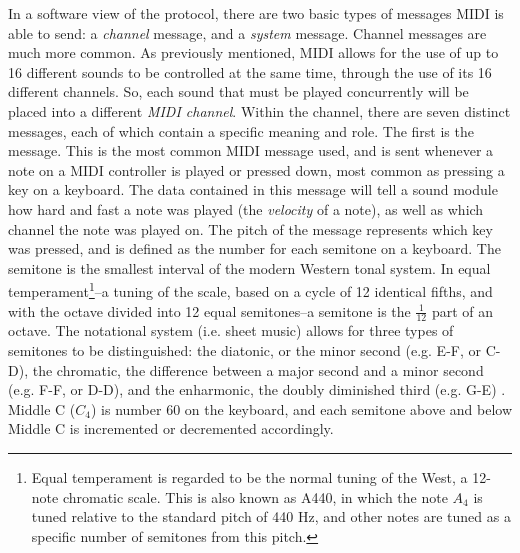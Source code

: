 In a software view of the protocol, there are two basic types of messages MIDI is able to send: a \textit{channel} message, and a \textit{system} message. Channel messages are much more common. As previously mentioned, MIDI allows for the use of up to 16 different sounds to be controlled at the same time, through the use of its 16 different channels. So, each sound that must be played concurrently will be placed into a different \textit{MIDI channel}. Within the channel, there are seven distinct messages, each of which contain a specific meaning and role. The first is the  message. This is the most common MIDI message used, and is sent whenever a note on a MIDI controller is played or pressed down, most common as pressing a key on a keyboard. The data contained in this message will tell a sound module how hard and fast a note was played (the \textit{velocity} of a note), as well as which channel the note was played on\cite{Romano_2003}. The pitch of the message represents which key was pressed, and is defined as the number for each semitone on a keyboard. The semitone is the smallest interval of the modern Western tonal system. In equal temperament\footnote{Equal temperament is regarded to be the normal tuning of the West, a 12-note chromatic scale. This is also known as A440, in which the note $A_4$ is tuned relative to the standard pitch of 440 Hz, and other notes are tuned as a specific number of semitones from this pitch.}--a tuning of the scale, based on a cycle of 12 identical fifths, and with the octave divided into 12 equal semitones--a semitone is the $\frac{1}{12}$ part of an octave. The notational system (i.e. sheet music) allows for three types of semitones to be distinguished: the diatonic, or the minor second (e.g. E-F, or C\musSharp{}-D), the chromatic, the difference between a major second and a minor second (e.g. F-F\musSharp{}, or D\musFlat{}-D), and the enharmonic, the doubly diminished third (e.g. G\musFlat{}\musFlat{}-E) \cite{Drabkin_Lindley_2001}. Middle C ($C_4$) is number 60 on the keyboard, and each semitone above and below Middle C is incremented or decremented accordingly\cite{Kirk_Hunt_2013}. 

